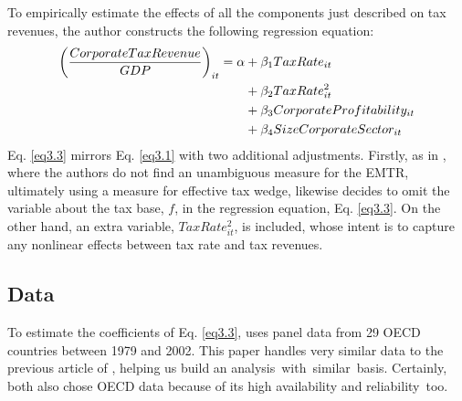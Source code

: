 To empirically estimate the effects of all the components just described on tax revenues, the author constructs the following regression equation:
\begin{align}\label{eq3.3}
    \left( \frac{CorporateTaxRevenue}{GDP}\right)_{it}=\alpha &+\beta_1 TaxRate_{it}\notag \\
    &+\beta_2 TaxRate^2_{it}\notag \\
    &+\beta_3 CorporateProfitability_{it}\notag \\
    &+\beta_4 SizeCorporateSector_{it}
\end{align}
Eq. \ref{eq3.3} mirrors Eq. \ref{eq3.1} with two additional adjustments.  Firstly, as in \textcite{dev-loc-red-08}, where the authors do not find an unambiguous measure for the EMTR, ultimately using a measure for effective tax wedge, likewise \textcite{clausing} decides to omit the variable about the tax base, $f$, in the regression equation, Eq. \ref{eq3.3}. On the other hand, an extra variable, $TaxRate^2_{it}$, is included, whose intent is to capture any nonlinear effects between tax rate and tax revenues.

\subsection{Data}

To estimate the coefficients of Eq. \ref{eq3.3}, \textcite{clausing} uses panel data from 29 OECD countries between 1979 and 2002. This paper handles very similar data to the previous article of \textcite{dev-loc-red-08}, helping us build an analysis~with~similar~basis. Certainly, both also chose OECD data because of its high availability and reliability~too.

